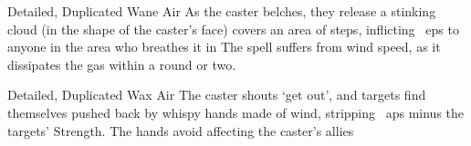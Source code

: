 \ifodd\value{diceNo}
  {Detailed, Duplicated}%
  {Wane}%
  {Air}%
  {}%
  {As the caster belches, they release a stinking cloud (in the shape of the caster's face) covers an area of  \glspl{step}, inflicting ~\glspl{ep} to anyone in the area who breathes it in}%
  {
    The spell suffers from wind speed, as it dissipates the gas within a round or two.
  }

\else

  {Detailed, Duplicated}%
  {Wax}%
  {Air}%
  {}%
  {The caster shouts `get out', and  targets find themselves pushed back by whispy hands made of wind, stripping ~\glspl{ap} minus the targets' Strength.
  The hands avoid affecting the caster's allies}%
  {}

\fi
{}
